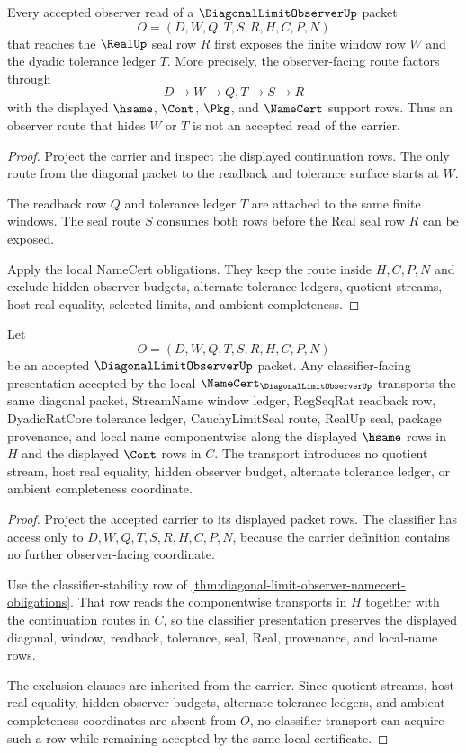 \begin{theorem}
\label{thm:diagonal-limit-observer-seal-exposure}
Every accepted observer read of a $\DiagonalLimitObserverUp$ packet
$$
O=(D,W,Q,T,S,R,H,C,P,N)
$$
that reaches the $\RealUp$ seal row $R$ first exposes the finite window row $W$ and the dyadic tolerance ledger $T$. More precisely, the observer-facing route factors through
$$
D \longrightarrow W \longrightarrow Q,T \longrightarrow S \longrightarrow R
$$
with the displayed $\hsame$, $\Cont$, $\Pkg$, and $\NameCert$ support rows. Thus an observer route that hides $W$ or $T$ is not an accepted read of the carrier.
\end{theorem}
\begin{proof}
Project the carrier and inspect the displayed continuation rows. The only route from the diagonal packet to the readback and tolerance surface starts at $W$.

The readback row $Q$ and tolerance ledger $T$ are attached to the same finite windows. The seal route $S$ consumes both rows before the Real seal row $R$ can be exposed.

Apply the local NameCert obligations. They keep the route inside $H,C,P,N$ and exclude hidden observer budgets, alternate tolerance ledgers, quotient streams, host real equality, selected limits, and ambient completeness.
\end{proof}

\begin{theorem}
\label{thm:diagonal-limit-observer-classifier-transport}
Let
$$
O=(D,W,Q,T,S,R,H,C,P,N)
$$
be an accepted $\DiagonalLimitObserverUp$ packet. Any classifier-facing presentation accepted by the local $\NameCert_{\DiagonalLimitObserverUp}$ transports the same diagonal packet, StreamName window ledger, RegSeqRat readback row, DyadicRatCore tolerance ledger, CauchyLimitSeal route, RealUp seal, package provenance, and local name componentwise along the displayed $\hsame$ rows in $H$ and the displayed $\Cont$ rows in $C$. The transport introduces no quotient stream, host real equality, hidden observer budget, alternate tolerance ledger, or ambient completeness coordinate.
\end{theorem}
\begin{proof}
Project the accepted carrier to its displayed packet rows. The classifier has access only to $D,W,Q,T,S,R,H,C,P,N$, because the carrier definition contains no further observer-facing coordinate.

Use the classifier-stability row of \autoref{thm:diagonal-limit-observer-namecert-obligations}. That row reads the componentwise transports in $H$ together with the continuation routes in $C$, so the classifier presentation preserves the displayed diagonal, window, readback, tolerance, seal, Real, provenance, and local-name rows.

The exclusion clauses are inherited from the carrier. Since quotient streams, host real equality, hidden observer budgets, alternate tolerance ledgers, and ambient completeness coordinates are absent from $O$, no classifier transport can acquire such a row while remaining accepted by the same local certificate.
\end{proof}

